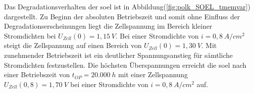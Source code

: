 \documentclass[onecolumn,10pt,titlepage]{article}
\begin{document}
Das Degradationsverhalten der \gls{soel} ist in Abbildung(\ref{fig:polk_SOEL_tmemvar}) dargestellt. Zu Beginn der absoluten Betriebszeit und somit ohne Einfluss der Degradationserscheinungen liegt die Zellspannung im Bereich kleiner Stromdichten bei $U_{Zell}(0)=1,15~V$. Bei einer Stromdichte von $i=0,8~A/cm^2$ steigt die Zellspannung auf einen Bereich von $U_{Zell}(0)=1,30~V$. Mit zunehmender Betriebszeit ist ein deutlicher Spannungsanstieg für sämtliche Stromdichten festzustellen. Die höchsten Überspannungen erreicht die \gls{soel} nach einer Betriebszeit von $t_{OP}=20.000~h$ mit einer Zellspannung $U_{Zell}(0,8)= 1,70~V$ bei einer Stromdichte von $i=0,8~A/cm^2$ auf.\\



\end{document}
